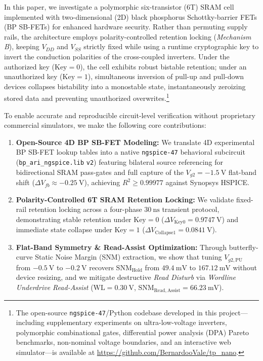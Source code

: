 \documentclass[conference]{IEEEtran}
\begin{document}
In this paper, we investigate a polymorphic six-transistor (6T) SRAM cell implemented with two-dimensional (2D) black phosphorus Schottky-barrier FETs (BP SB-FETs) for enhanced hardware security. Rather than permuting supply rails, the architecture employs polarity-controlled retention locking (\textit{Mechanism B}), keeping $V_{DD}$ and $V_{SS}$ strictly fixed while using a runtime cryptographic key to invert the conduction polarities of the cross-coupled inverters. Under the authorized key ($\text{Key}=0$), the cell exhibits robust bistable retention; under an unauthorized key ($\text{Key}=1$), simultaneous inversion of pull-up and pull-down devices collapses bistability into a monostable state, instantaneously zeroizing stored data and preventing unauthorized overwrites.\footnote{The open-source \texttt{ngspice-47}/Python codebase developed in this project---including supplementary experiments on ultra-low-voltage inverters, polymorphic combinational gates, differential power analysis (DPA) Pareto benchmarks, non-nominal voltage boundaries, and an interactive web simulator---is available at \url{https://github.com/BernardooVale/tp_nano}.}

To enable accurate and reproducible circuit-level verification without proprietary commercial simulators, we make the following core contributions:
\begin{enumerate}
    \item \textbf{Open-Source 4D BP SB-FET Modeling:} We translate 4D experimental BP SB-FET lookup tables into a native \texttt{ngspice-47} behavioral subcircuit (\texttt{bp\_ari\_\allowbreak ngspice.lib} \texttt{v2}) featuring bilateral source referencing for bidirectional SRAM pass-gates and full capture of the $V_{g2}=-1.5\ \text{V}$ flat-band shift ($\Delta V_{fb} \approx -0.25\ \text{V}$), achieving $R^2 \ge 0.99977$ against Synopsys HSPICE.
    \item \textbf{Polarity-Controlled 6T SRAM Retention Locking:} We validate fixed-rail retention locking across a four-phase $30\ \text{ns}$ transient protocol, demonstrating stable retention under $\text{Key}=0$ ($\Delta V_{\mathrm{Key0}}=0.9747\ \text{V}$) and immediate state collapse under $\text{Key}=1$ ($\Delta V_{\mathrm{Collapse1}}=0.0841\ \text{V}$).
    \item \textbf{Flat-Band Symmetry \& Read-Assist Optimization:} Through butterfly-curve Static Noise Margin (SNM) extraction, we show that tuning $V_{g2,\mathrm{PU}}$ from $-0.5\ \text{V}$ to $-0.2\ \text{V}$ recovers $\mathrm{SNM}_{\mathrm{Hold}}$ from $49.4\ \text{mV}$ to $167.12\ \text{mV}$ without device resizing, and we mitigate destructive \textit{Read Disturb} via \textit{Wordline Underdrive Read-Assist} ($\mathrm{WL}=0.30\ \text{V}$, $\mathrm{SNM}_{\mathrm{Read,Assist}}=66.23\ \text{mV}$).
\end{enumerate}
\end{document}
